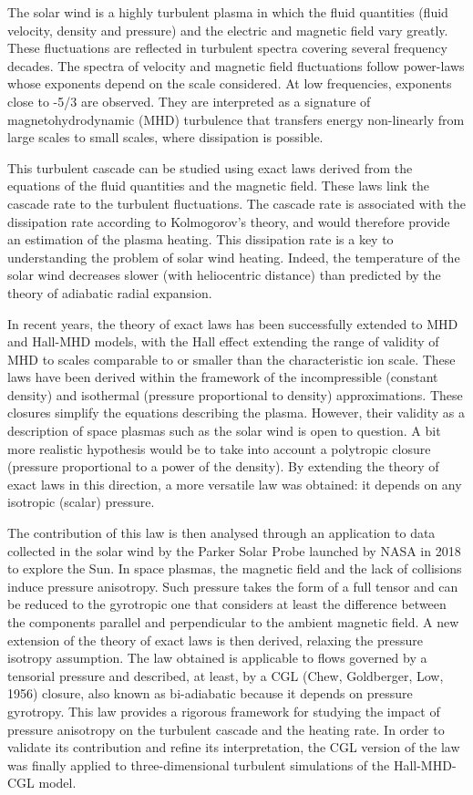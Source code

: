 	The solar wind is a highly turbulent plasma in which the fluid quantities (fluid velocity, density and pressure) and the electric and magnetic field vary greatly. These fluctuations are reflected in turbulent spectra covering several frequency decades. The spectra of velocity and magnetic field fluctuations follow power-laws whose exponents depend on the scale considered. At low frequencies, exponents close to -5/3 are observed. They are interpreted as a signature of magnetohydrodynamic (MHD) turbulence that transfers energy non-linearly from large scales to small scales, where dissipation is possible.
	
	This turbulent cascade can be studied using exact laws derived from the equations of the fluid quantities and the magnetic field. These laws link the cascade rate to the turbulent fluctuations. The cascade rate is associated with the dissipation rate according to Kolmogorov's theory, and would therefore provide an estimation of the plasma heating. This dissipation rate is a key to understanding the problem of solar wind heating. Indeed, the temperature of the solar wind decreases slower (with heliocentric distance) than predicted by the theory of adiabatic radial expansion.  
	
   	 In recent years, the theory of exact laws has been successfully extended to MHD and Hall-MHD models, with the Hall effect extending the range of validity of MHD to scales comparable to or smaller than the characteristic ion scale. These laws have been derived within the framework of the incompressible (constant density) and isothermal (pressure proportional to density) approximations. These closures simplify the equations describing the plasma. However, their validity as a description of space plasmas such as the solar wind is open to question. A bit more realistic hypothesis would be to take into account a polytropic closure (pressure proportional to a power of the density). By extending the theory of exact laws in this direction, a more versatile law was obtained: it depends on any isotropic (scalar) pressure. 
   	 
The contribution of this law is then analysed through an application to data collected in the solar wind by the Parker Solar Probe launched by NASA in 2018 to explore the Sun.
	In space plasmas, the magnetic field and the lack of collisions induce pressure anisotropy.  Such pressure takes the form of a full tensor and can be reduced to the gyrotropic one that considers at least the difference between the components parallel and perpendicular to the ambient magnetic field.  A new extension of the theory of exact laws is then derived, relaxing the pressure isotropy assumption. The law obtained is applicable to flows governed by a tensorial pressure and described, at least, by a CGL (Chew, Goldberger, Low, 1956) closure, also known as bi-adiabatic because it depends on pressure gyrotropy. This law provides a rigorous framework for studying the impact of pressure anisotropy on the turbulent cascade and the heating rate. In order to validate its contribution and refine its interpretation, the CGL version of the law was finally applied to three-dimensional turbulent simulations of the Hall-MHD-CGL model.
